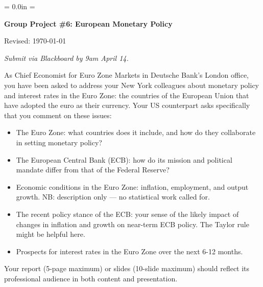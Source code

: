 \documentclass[letterpaper,12pt]{article}
\def\HeadName{Group Project \#6}
\begin{document}
\parindent = 0.0in
\parskip = \bigskipamount
\thispagestyle{empty}%
\Head

\centerline{\large \bf \HeadName:  European Monetary Policy}%
\centerline{Revised:  \today}

\medskip
{\it Submit via Blackboard by 9am April 14.}
\medskip

As Chief Economist for Euro Zone Markets in Deutsche Bank's London office,
you have been asked to address your New York colleagues 
about monetary policy and interest rates in the Euro Zone:
the countries of the European Union that have adopted 
the euro as their currency.  
Your US counterpart asks specifically that you comment on these issues:   
%
\begin{itemize}
\item The Euro Zone:  what countries does it include, 
and how do they collaborate in setting monetary policy?  

\item The European Central Bank (ECB):  how do its mission 
and political mandate differ from that of the Federal Reserve?  

\item Economic conditions in the Euro Zone:   
inflation, employment, and output growth.
NB:  description only --- no statistical work called for.  

\item The recent policy stance of the ECB:  
your sense of the likely impact of changes in inflation 
and growth on  near-term ECB policy.  
The Taylor rule might be helpful here.  

\item Prospects for interest rates in the Euro Zone over the next 6-12 months. 
\end{itemize}
%
Your report (5-page maximum) or 
slides (10-slide maximum) 
should reflect its professional audience in both content and presentation. 
   
\end{document}
